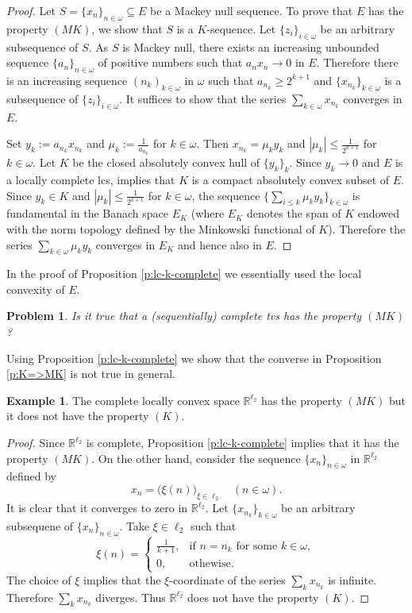 \documentclass[preprint,11pt]{elsarticle}
\newtheorem{problem}[theorem]{Problem}
\theoremstyle{definition}
\newtheorem{example}[theorem]{Example}
\theoremstyle{remark}
\numberwithin{equation}{section}
\numberwithin{theorem}{section}
\newcommand{\w}{\omega}
\newcommand{\NN}{\mathbb{N}}
\newcommand{\IR}{\mathbb{R}}
\begin{document}
\begin{proof}
Let $S=\{x_n\}_{n\in\w}\subseteq E$ be a Mackey null sequence. To prove that $E$  has the property $(MK)$, we show that $S$ is a $K$-sequence. Let $\{z_i\}_{i\in\w} $ be an arbitrary subsequence of $S$. As $S$ is Mackey null, there exists an  increasing unbounded sequence  $\{a_n\}_{n\in\w}$ of positive numbers such that $a_nx_n \to 0$ in $E$. Therefore there is an increasing sequence  $(n_k)_{k\in\w}$ in $\w$ such that $a_{n_k}\geq 2^{k+1}$ and $\{x_{n_k}\}_{k\in\w}$ is a subsequence of $\{z_i\}_{i\in\w}$. It suffices to show that the series $\sum_{k\in\w} x_{n_k}$ converges in $E$.


Set $y_k:=a_{n_k} x_{n_k}$ and $\mu_k:=\tfrac{1}{a_{n_k}}$ for $k\in \w$. Then $x_{n_k} = \mu_k y_k$ and $|\mu_k|\leq \tfrac{1}{2^{k+1}}$ for $k\in \w$.
Let $K$ be the closed absolutely convex hull of $\{y_k\}_k$. Since $y_k\to 0$ and $E$ is a locally complete lcs, \cite[Theorem 2.10.21]{BS2017tvs} implies that $K$ is a compact absolutely convex subset of $E$.
Since $y_k\in K$ and $|\mu_k|\leq \tfrac{1}{2^{k+1}}$ for $k\in \w$, the sequence $\{\sum_{i\leq k} \mu_k y_k\}_{k\in\w}$ is fundamental in the Banach space $E_K$ (where $E_K$ denotes the span of $K$ endowed with the norm topology defined by the Minkowski functional of $K$). Therefore the series $\sum_{k\in\w} \mu_k y_k$ converges in $E_K$ and hence also in $E$.
\end{proof}

In the proof of Proposition \ref{p:lc-k-complete} we essentially used the local convexity of $E$.
\begin{problem}
Is it true that a (sequentially) complete tvs has the property $(MK)$?
\end{problem}


Using Proposition \ref{p:lc-k-complete} we show that the converse in Proposition \ref{p:K=>MK} is not true in general.

\begin{example} \label{exa:MK-not=K}
The complete locally convex space  $\IR^{\ell_2}$ has the property $(MK)$ but it does not have the property $(K)$.
\end{example}

\begin{proof}
Since $\IR^{\ell_2}$ is complete, Proposition \ref{p:lc-k-complete} implies that it has the property $(MK)$. On the other hand, consider the sequence $\{x_n\}_{n\in\w}$ in $\IR^{\ell_2}$ defined by
\[
x_n=\big(\xi(n)\big)_{\xi\in\ell_2} \quad (n\in\w).
\]
It is clear that it converges to zero in $\IR^{\ell_2}$. Let $\{x_{n_k} \}_{k\in\w}$ be an arbitrary subsequene of $\{x_n\}_{n\in\w}$. Take $\xi\in\ell_2$ such that
\[
\xi(n) = \begin{cases}
\frac{1}{k+1}, & \mbox{if } n = n_k\text{ for some }k\in\w,
\\
0, & \text{othewise}.
\end{cases}
\]
The choice of $\xi$ implies that the $\xi$-coordinate of the series $\sum_k x_{n_k}$ is infinite. Therefore $\sum_k x_{n_k}$ diverges. Thus $\IR^{\ell_2}$  does not have the property $(K)$.
\end{proof}
\end{document}
